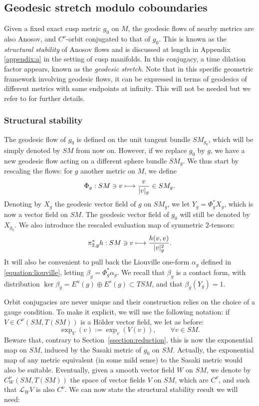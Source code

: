 \documentclass[10pt]{amsart}
\newcommand\mto{\mathchoice{\longmapsto}{\mapsto}{\mapsto}{\mapsto}}
\theoremstyle{plain}
\theoremstyle{definition}
\begin{document}
\subsection{Geodesic stretch modulo coboundaries} Given a fixed exact cusp metric $g_0$ on $M$, the geodesic flows of nearby metrics are also Anosov, and $C^\nu$-orbit conjugated to that of $g_0$. This is known as the \emph{structural stability} of Anosov flows and is discussed at length in Appendix \ref{appendix:a} in the setting of cusp manifolds. In this conjugacy, a time dilation factor appears, known as the \emph{geodesic stretch}. Note that in this specific geometric framework involving geodesic flows, it can be expressed in terms of geodesics of different metrics with same endpoints at infinity. This will not be needed but we refer to \cite{gromov} for further details.

\subsubsection{Structural stability} The geodesic flow of $g_0$ is defined on the unit tangent bundle $SM_{g_0}$, which will be simply denoted by $SM$ from now on. However, if we replace $g_0$ by $g$, we have a new geodesic flow acting on a different sphere bundle $SM_g$. We thus start by rescaling the flows: for $g$ another metric on $M$, we define
\[
\Phi_g : SM \owns v \mto \frac{v}{|v|_g} \in SM_g.
\]
Denoting by $X_g$ the geodesic vector field of $g$ on $SM_g$, we let $Y_g = \Phi_g^\ast X_g$, which is now a vector field on $SM$. The geodesic vector field of $g_0$ will still be denoted by $X_{g_0}$. We also introduce the rescaled evaluation map of symmetric $2$-tensors:
\[
\pi_{2,g}^\ast h : SM \owns v \mto \frac{ h(v,v)}{|v|_g^2}.
\]
It will also be convenient to pull back the Liouville one-form $\alpha_g$ defined in \eqref{equation:liouville}, letting $\beta_g = \Phi_g^\ast \alpha_g$. We recall that $\beta_g$ is a contact form, with distribution $\ker \beta_g = E^u(g) \oplus E^s(g)\subset TSM$, and that $\beta_g(Y_g) = 1$.

Orbit conjugacies are never unique and their construction relies on the choice of a gauge condition. To make it explicit, we will use the following notation: if $V\in C^\nu(SM, T(SM))$ is a H\"older vector field, we let as before:
\[
\exp_V (v) := \exp_v( V(v)), \qquad \forall v \in SM.
\]
Beware that, contrary to Section~\ref{ssection:reduction}, this is now the exponential map on $SM$, induced by the Sasaki metric of $g_0$ on $SM$. Actually, the exponential map of any metric equivalent (in some mild sense) to the Sasaki metric would also be suitable. Eventually, given a smooth vector field $W$ on $SM$, we denote by $C^\nu_W(SM, T(SM))$ the space of vector fields $V$ on $SM$, which are $C^\nu$, and such that $\mathcal{L}_W V$ is also $C^\nu$. We can now state the structural stability result we will need:
\end{document}
